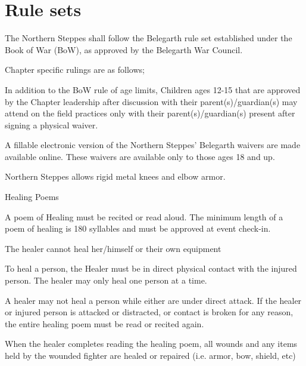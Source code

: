 \documentclass[12pt]{article}
\begin{document}
\section{Rule sets}
\begin{level}
    \item The Northern Steppes shall follow the Belegarth rule set established under the Book of War (BoW), as approved by the Belegarth War Council.
    \item Chapter specific rulings are as follows;
    \begin{level}
        \item In addition to the BoW rule of age limits, Children ages 12-15 that are approved by the
Chapter leadership after discussion with their parent(s)/guardian(s) may attend on the
field practices only with their parent(s)/guardian(s) present after signing a physical waiver.
        \item A fillable electronic version of the Northern Steppes' Belegarth waivers are made
available online. These waivers are available only to those ages 18 and up.
        \item Northern Steppes allows rigid metal knees and elbow armor.
        \item Healing Poems
        \begin{level}
            \item A poem of Healing must be recited or read aloud. The minimum length of a poem of healing is 180 syllables and must be approved at event check-in.
            \item The healer cannot heal her/himself or their own equipment
            \item To heal a person, the Healer must be in direct physical contact with the injured person. The healer may only heal one person at a time.
            \item A healer may not heal a person while either are under direct attack. If the healer or injured person is attacked or distracted, or contact is broken for any reason, the entire healing poem must be read or recited again.
            \item When the healer completes reading the healing poem, all wounds and any items held by the wounded fighter are healed or repaired (i.e. armor, bow, shield, etc)
        \end{level}
    \end{level}
\end{level}
\end{document}
